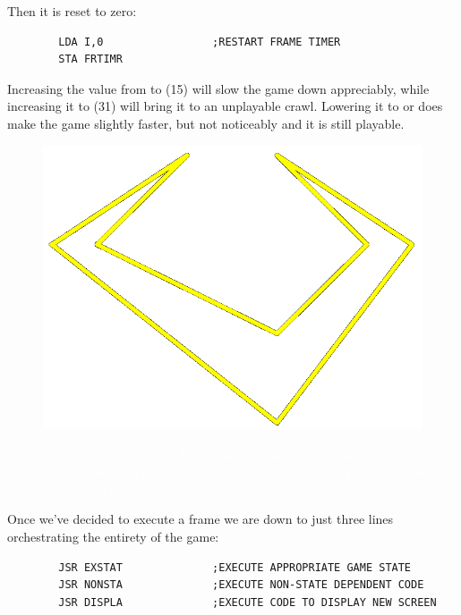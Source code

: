 Then it is reset to zero:
\begin{lstlisting}
        LDA I,0                 ;RESTART FRAME TIMER
        STA FRTIMR
\end{lstlisting}
Increasing the value from  to  (15) will slow the game down appreciably, while increasing
it to  (31) will bring it to an unplayable crawl. Lowering it to  or  does make the game slightly
faster, but not noticeably and it is still playable.

\begin{definition}
\setlength{\intextsep}{0pt}%
\setlength{\columnsep}{3pt}%
\begin{figure}
\includegraphics[width=\linewidth]{src/callout/claw_t.png} 
\end{figure}
\small
\textcolor{white}{
  But what increments  you ask? The answer is a piece of code in what is known
  as an 'interrupt handler'. This runs separately from the main loop and is invoked by the CPU up to 60
  times a second.
}
\end{definition}

Once we've decided to execute a frame we are down to just three lines orchestrating the entirety of the game:

\begin{lstlisting}
        JSR EXSTAT              ;EXECUTE APPROPRIATE GAME STATE
        JSR NONSTA              ;EXECUTE NON-STATE DEPENDENT CODE
        JSR DISPLA              ;EXECUTE CODE TO DISPLAY NEW SCREEN
\end{lstlisting}

